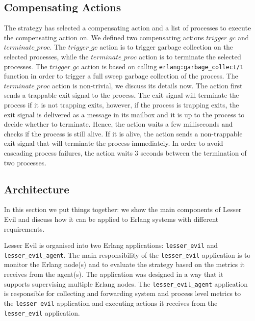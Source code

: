 \documentclass{llncs}
\begin{document}
\subsection{Compensating Actions}
\label{sec:actions}
The strategy has selected a compensating action and a list of processes to execute the compensating action on. We defined two compensating actions $\mathit{trigger\_gc}$ and $\mathit{terminate\_proc}$. The $\mathit{trigger\_gc}$ action is to trigger garbage collection on the selected processes, while the $\mathit{terminate\_proc}$ action is to terminate the selected processes. The $\mathit{trigger\_gc}$ action is based on calling \verb+erlang:garbage_collect/1+ function in order to trigger a full sweep garbage collection of the process. The $\mathit{terminate\_proc}$ action is non-trivial, we discuss its details now. The action first sends a trappable exit signal to the process. The exit signal will terminate the process if it is not trapping exits, however, if the process is trapping exits, the exit signal is delivered as a message in its mailbox and it is up to the process to decide whether to terminate. Hence, the action waits a few milliseconds and checks if the process is still alive. If it is alive, the action sends a non-trappable exit signal that will terminate the process immediately. In order to avoid cascading process failures, the action waits $3$ seconds between the termination of two processes.

\subsection{Architecture}
In this section we put things together: we show the main components  of Lesser Evil and discuss how it can be applied to Erlang systems with different requirements.

Lesser Evil is organised into two Erlang applications: \verb+lesser_evil+ and \\ \verb+lesser_evil_agent+. The main responsibility of the \verb+lesser_evil+ application is to monitor the Erlang node(s) and to evaluate the strategy based on the metrics it receives from the agent(s). The application was designed in a way that it supports supervising multiple Erlang nodes. The \verb+lesser_evil_agent+ application is responsible for collecting and forwarding system and process level metrics to the \verb+lesser_evil+ application and executing actions it receives from the \verb+lesser_evil+ application. 

\end{document}
